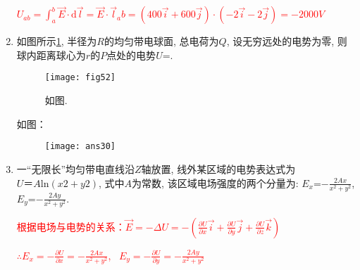 \begin{enumerate}
    \begin{note}
        \textcolor{red}{$U_{ab}=\int_a^b \vec{E}\cdot \mathrm{d} \vec{l}=\vec{E}\cdot \vec{l}_ab=(400\vec{i}+600\vec{j})\cdot (-2\vec{i}-2\vec{j})=-2000V$}
    \end{note}
    \item 如图所示\ref{Fig:52}, 半径为$R$的均匀带电球面, 总电荷为$Q$, 设无穷远处的电势为零, 则球内距离球心为$r$的$P$点处的电势$U$=. 
    \begin{figure}[H]
        \centering
        \texttt{[image: fig52]}
        \caption{如图.}\label{Fig:52}
    \end{figure}
    \begin{note}
        如图：
        \begin{figure}[H]
            \centering
            \texttt{[image: ans30]}
        \end{figure}
    \end{note}
    \item 一“无限长”均匀带电直线沿$Z$轴放置, 线外某区域的电势表达式为$U＝A\mathrm{ln}(x2+y2)$, 式中$A$为常数, 该区域电场强度的两个分量为: $E_x$=\underline{$-\frac{2Ax}{x^2+y^2}$}, $E_y$=\underline{$-\frac{2Ay}{x^2+y^2}$}.
    \begin{note}
        \textcolor{red}{根据电场与电势的关系：$\vec{E}=-\Delta U=-\left(\frac{\partial U}{\partial x}\vec{i}+\frac{\partial U}{\partial y}\vec{j}+\frac{\partial U}{\partial z}\vec{k}\right)$}\par
        \textcolor{red}{$\therefore E_x = -\frac{\partial U}{\partial x}=-\frac{2Ax}{x^2+y^2}$, \ $E_y = -\frac{\partial U}{\partial y}=-\frac{2Ay}{x^2+y^2}$}
    \end{note}
\end{enumerate}

